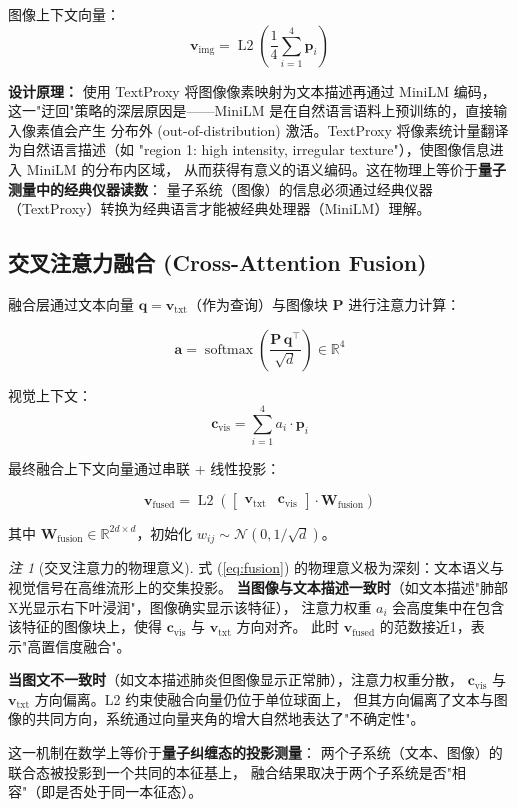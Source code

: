 \documentclass[11pt,a4paper]{ctexart}
\theoremstyle{remark}
\newtheorem{remark}{注}[section]
\DeclareMathOperator{\softmax}{softmax}
\DeclareMathOperator{\Ltwo}{L2}
\begin{document}
图像上下文向量：
\begin{equation}
\mathbf{v}_{\text{img}} = \Ltwo\left(\frac{1}{4}\sum_{i=1}^{4} \mathbf{p}_i\right)
\end{equation}

\textbf{设计原理：} 使用 TextProxy 将图像像素映射为文本描述再通过 MiniLM 编码，
这一"迂回"策略的深层原因是——MiniLM 是在自然语言语料上预训练的，直接输入像素值会产生
分布外 (out-of-distribution) 激活。TextProxy 将像素统计量翻译为自然语言描述（如
"region 1: high intensity, irregular texture"），使图像信息进入 MiniLM 的分布内区域，
从而获得有意义的语义编码。这在物理上等价于\textbf{量子测量中的经典仪器读数}：
量子系统（图像）的信息必须通过经典仪器（TextProxy）转换为经典语言才能被经典处理器（MiniLM）理解。

\subsection{交叉注意力融合 (Cross-Attention Fusion)}

融合层通过文本向量 $\mathbf{q} = \mathbf{v}_{\text{txt}}$（作为查询）与图像块 $\mathbf{P}$ 进行注意力计算：

\begin{equation}
\mathbf{a} = \softmax\left(\frac{\mathbf{P}\,\mathbf{q}^{\top}}{\sqrt{d}}\right) \in \mathbb{R}^{4}
\end{equation}

视觉上下文：
\begin{equation}
\mathbf{c}_{\text{vis}} = \sum_{i=1}^{4} a_i \cdot \mathbf{p}_i
\end{equation}

最终融合上下文向量通过串联 + 线性投影：

\begin{equation}
\mathbf{v}_{\text{fused}} = \Ltwo\left(\begin{bmatrix} \mathbf{v}_{\text{txt}} & \mathbf{c}_{\text{vis}} \end{bmatrix} \cdot \mathbf{W}_{\text{fusion}}\right)
\label{eq:fusion}
\end{equation}

其中 $\mathbf{W}_{\text{fusion}} \in \mathbb{R}^{2d \times d}$，初始化 $w_{ij} \sim \mathcal{N}(0, 1/\sqrt{d})$。

\begin{remark}[交叉注意力的物理意义]
式 (\ref{eq:fusion}) 的物理意义极为深刻：文本语义与视觉信号在高维流形上的交集投影。
\textbf{当图像与文本描述一致时}（如文本描述"肺部X光显示右下叶浸润"，图像确实显示该特征），
注意力权重 $a_i$ 会高度集中在包含该特征的图像块上，使得 $\mathbf{c}_{\text{vis}}$ 与 $\mathbf{v}_{\text{txt}}$ 方向对齐。
此时 $\mathbf{v}_{\text{fused}}$ 的范数接近1，表示"高置信度融合"。

\textbf{当图文不一致时}（如文本描述肺炎但图像显示正常肺），注意力权重分散，
$\mathbf{c}_{\text{vis}}$ 与 $\mathbf{v}_{\text{txt}}$ 方向偏离。L2 约束使融合向量仍位于单位球面上，
但其方向偏离了文本与图像的共同方向，系统通过向量夹角的增大自然地表达了"不确定性"。

这一机制在数学上等价于\textbf{量子纠缠态的投影测量}：
两个子系统（文本、图像）的联合态被投影到一个共同的本征基上，
融合结果取决于两个子系统是否"相容"（即是否处于同一本征态）。
\end{remark}
\end{document}
